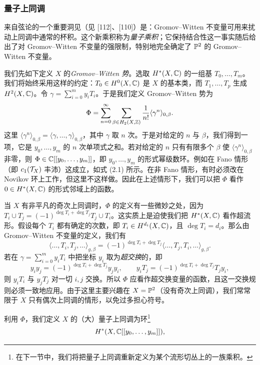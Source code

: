 \subsubsection{量子上同调}

来自弦论的一个重要洞见（见 [112]、[110]）是：Gromov–Witten 不变量可用来扰动上同调中通常的杯积。这个新乘积称为\emph{量子乘积}；它保持结合性这一事实随后给出了对 Gromov–Witten 不变量的强限制，特别地完全确定了 $\mathbb{P}^2$ 的 Gromov–Witten 不变量。

我们先如下定义 $X$ 的\emph{Gromov–Witten 势}。选取 $H^{*}(X,\mathbb{C})$ 的一组基 $T_0,\dots,T_m$。我们将始终采用这样的约定：$T_0\in H^0(X,\mathbb{C})$ 是 $X$ 的基本类，而 $T_1,\dots,T_p$ 生成 $H^2(X,\mathbb{C})$。令 $\gamma=\sum_{i=0}^{m}y_iT_i$。于是我们定义 Gromov–Witten 势为
\[
\Phi=\sum_{n=0}^{\infty}\sum_{\beta\in H_2(X,\mathbb{Z})}\frac{1}{n!}\langle\gamma^n\rangle_{0,\beta}.
\]
这里 $\langle\gamma^n\rangle_{0,\beta}=\langle\gamma,\dots,\gamma\rangle_{0,\beta}$，其中 $\gamma$ 取 $n$ 次。于是对给定的 $n$ 与 $\beta$，我们得到一项，它是 $y_0,\dots,y_m$ 的 $n$ 次单项式之和。若对给定的 $n$ 只有有限多个 $\beta$ 使 $\langle\gamma^n\rangle_{0,\beta}$ 非零，则 $\Phi\in\mathbb{C}[[y_0,\dots,y_m]]$，即 $y_0,\dots,y_m$ 的形式幂级数环。例如在 Fano 情形（即 $c_1(\mathcal{T}_X)$ 丰沛）这成立，如式 (2.1) 所示。在非 Fano 情形，有时必须改在 Novikov 环上工作，但这里不这样做。因此在上述情形下，我们可以把 $\Phi$ 看作 $0\in H^{*}(X,\mathbb{C})$ 的形式邻域上的函数。

当 $X$ 有非平凡的奇次上同调时，$\Phi$ 的定义有一些微妙之处，因为 $T_i\cup T_j=(-1)^{\deg T_i+\deg T_j}T_j\cup T_i$。这实质上是迫使我们把 $H^{*}(X,\mathbb{C})$ 看作超流形。假设每个 $T_i$ 都有确定的次数，即 $T_i\in H^{d_i}(X,\mathbb{C})$，且 $\deg T_i=d_i$。那么由 Gromov–Witten 不变量的定义，我们有
\[
\langle\dots,T_i,T_j,\dots\rangle_{g,\beta}=(-1)^{\deg T_i+\deg T_j}\langle\dots,T_j,T_i,\dots\rangle_{g,\beta}.
\]
若在 $\gamma=\sum_{i=0}^{m}y_iT_i$ 中把坐标 $y_i$ 取为\emph{超交换}的，即
\[
y_iy_j=(-1)^{\deg T_i+\deg T_j}y_jy_i,\qquad y_iT_j=(-1)^{\deg T_i+\deg T_j}T_jy_i,
\]
则 $y_iT_i$ 与 $y_jT_j$ 对一切 $i,j$ 交换。所以 $\Phi$ 应看作超交换变量的函数，且这一交换规则必须一致地应用。由于这里主要兴趣在 $X=\mathbb{P}^2$（没有奇次上同调），我们常常限于 $X$ 只有偶次上同调的情形，以免过多担心符号。

利用 $\Phi$，我们定义 $X$ 的（大）量子上同调为环\footnote{在下一节中，我们将把量子上同调重新定义为某个流形切丛上的一族乘积。}
\[
H^{*}(X,\mathbb{C}[[y_0,\dots,y_m]]),
\]

